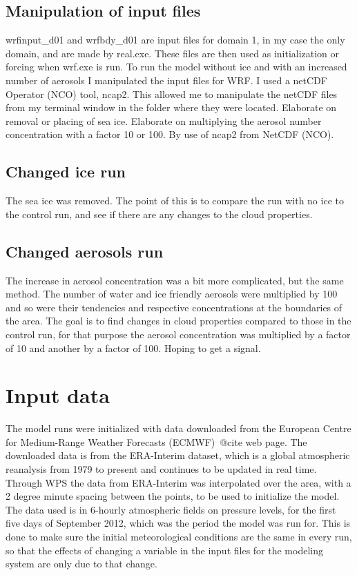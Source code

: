 \subsection{Manipulation of input files}
wrfinput\_d01 and wrfbdy\_d01 are input files for domain 1, in my case the only domain, and are made by real.exe. These files are then used as initialization or forcing when wrf.exe is run.
To run the model without ice and with an increased number of aerosols I manipulated the input files for WRF. I used a netCDF Operator (NCO) tool, ncap2. This allowed me to manipulate the netCDF files from my terminal window in the folder where they were located.
Elaborate on removal or placing of sea ice. Elaborate on multiplying the aerosol number concentration with a factor 10 or 100. By use of ncap2 from NetCDF (NCO).

\subsection{Changed ice run}
The sea ice was removed. 
The point of this is to compare the run with no ice to the control run, and see if there are any changes to the cloud properties.

\subsection{Changed aerosols run}
The increase in aerosol concentration was a bit more complicated, but the same method. The number of water and ice friendly aerosols were multiplied by 100 and so were their tendencies and respective concentrations at the boundaries of the area. The goal is to find changes in cloud properties compared to those in the control run, for that purpose the aerosol concentration was multiplied by a factor of 10 and another by a factor of 100. Hoping to get a signal.

\section{Input data}
\label{sec:inputdata}
The model runs were initialized with data downloaded from the European Centre for Medium-Range Weather Forecasts (ECMWF)~@cite web page.%
The downloaded data is from the ERA-Interim dataset, which is a global atmospheric reanalysis from 1979 to present and continues to be updated in real time.%
Through WPS the data from ERA-Interim was interpolated over the area, with a 2 degree minute spacing between the points, to be used to initialize the model. The data used is in 6-hourly atmospheric fields on pressure levels, for the first five days of September 2012, which was the period the model was run for. This is done to make sure the initial meteorological conditions are the same in every run, so that the effects of changing a variable in the input files for the modeling system are only due to that change.

